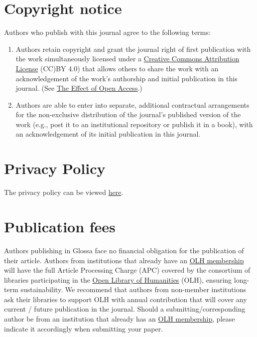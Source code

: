 \documentclass[charis,linguex]{glossa}
\begin{document}
\section{Copyright notice}

Authors who publish with this journal agree to the following terms:

\begin{enumerate}[label=\arabic*.]
\item Authors retain copyright and grant the journal right of first publication with the work simultaneously licensed under a \href{https://creativecommons.org/licenses/by/4.0/}{Creative Commons Attribution License} (CC)BY 4.0) that allows others to share the work with an acknowledgement of the work's authorship and initial publication in this journal. (See \href{http://opcit.eprints.org/oacitation-biblio.html}{The Effect of Open Access}.)
\item Authors are able to enter into separate, additional contractual arrangements for the non-exclusive distribution of the journal's published version of the work (e.g., post it to an institutional repository or publish it in a book), with an acknowledgement of its initial publication in this journal.
\end{enumerate}

\section{Privacy Policy}

The privacy policy can be viewed \href{https://www.openlibhums.org/site/privacy/}{here}.

\section{Publication fees}

Authors publishing in Glossa face no financial obligation for the publication of their article. Authors from institutions that already have an  \href{https://www.openlibhums.org/plugins/supporters/}{OLH membership} will have the full Article Processing Charge (APC) covered by the consortium of libraries participating in the \href{https://www.openlibhums.org}{Open Library of Humanities} (OLH), ensuring long-term sustainability. We recommend that authors from non-member institutions ask their libraries to support OLH with annual contribution that will cover any current / future publication in the journal. Should a submitting/corresponding author be from an institution that already has an \href{https://www.openlibhums.org/plugins/supporters/}{OLH membership}, please indicate it accordingly when submitting your paper. 
\end{document}
